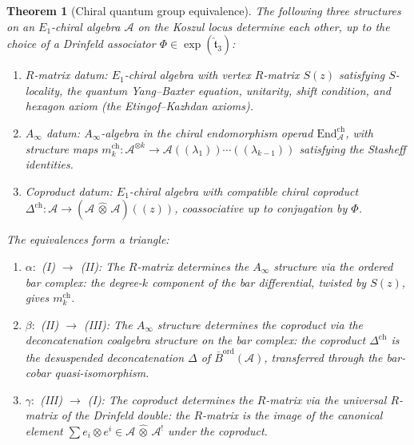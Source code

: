 \documentclass[11pt,reqno]{amsart}
\newtheorem{theorem}{Theorem}[section]
\theoremstyle{definition}
\theoremstyle{remark}
\providecommand{\cA}{\mathcal{A}}
\providecommand{\Ainf}{A_\infty}
\providecommand{\Eone}{E_1}
\providecommand{\Barord}{\bar{B}^{\mathrm{ord}}}
\providecommand{\End}{\mathrm{End}}
\begin{document}
\begin{theorem}[Chiral quantum group equivalence]
\label{thm:e-chiral-qg-equiv}
The following three structures on an $\Eone$-chiral
algebra $\cA$ on the Koszul locus determine each other,
up to the choice of a Drinfeld associator
$\Phi \in \exp(\hat{\mathfrak{t}}_3)$:
\begin{enumerate}[label=\textup{(\Roman*)}]
\item \emph{$R$-matrix datum:}
 $\Eone$-chiral algebra with vertex $R$-matrix $S(z)$
 satisfying $S$-locality, the quantum Yang--Baxter
 equation, unitarity, shift condition, and hexagon axiom
 \textup{(}the Etingof--Kazhdan axioms\textup{)}.
\item \emph{$\Ainf$ datum:}
 $\Ainf$-algebra in the chiral endomorphism operad
 $\End^{\mathrm{ch}}_\cA$, with structure maps
 $m_k^{\mathrm{ch}} \colon
 \cA^{\otimes k} \to
 \cA((\lambda_1))\cdots((\lambda_{k-1}))$
 satisfying the Stasheff identities.
\item \emph{Coproduct datum:}
 $\Eone$-chiral algebra with compatible chiral coproduct
 $\Delta^{\mathrm{ch}} \colon
 \cA \to (\cA \,\hat{\otimes}\, \cA)((z))$,
 coassociative up to conjugation by $\Phi$.
\end{enumerate}
The equivalences form a triangle:
\begin{enumerate}[label=\textup{(\roman*)}]
\item $\alpha\colon$ \textup{(I)} $\to$ \textup{(II):}
 The $R$-matrix determines the $\Ainf$ structure via the
 ordered bar complex: the degree-$k$ component of the bar
 differential, twisted by $S(z)$, gives $m_k^{\mathrm{ch}}$.
\item $\beta\colon$ \textup{(II)} $\to$ \textup{(III):}
 The $\Ainf$ structure determines the coproduct via the
 deconcatenation coalgebra structure on the bar complex:
 the coproduct $\Delta^{\mathrm{ch}}$ is the desuspended
 deconcatenation $\Delta$ of $\Barord(\cA)$, transferred
 through the bar-cobar quasi-isomorphism.
\item $\gamma\colon$ \textup{(III)} $\to$ \textup{(I):}
 The coproduct determines the $R$-matrix via the universal
 $R$-matrix of the Drinfeld double: the $R$-matrix is
 the image of the canonical element
 $\sum e_i \otimes e^i \in
 \cA \,\hat{\otimes}\, \cA^!$ under the coproduct.
\end{enumerate}
\end{theorem}
\end{document}
